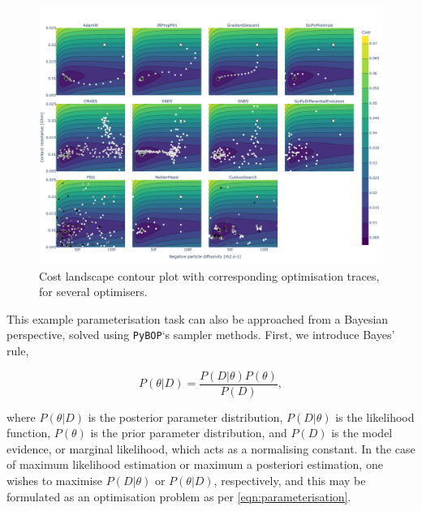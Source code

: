 \documentclass[
]{article}
\begin{document}
\begin{figure}[htb]
\centering
\includegraphics[width=1\textwidth,height=\textheight]{figures/joss/contour_subplot.pdf}
\caption{Cost landscape contour plot with corresponding optimisation
traces, for several optimisers. \label{fig:optimiser-inference2}}
\end{figure}

This example parameterisation task can also be approached from a
Bayesian perspective, solved using \texttt{PyBOP}`s sampler methods.
First, we introduce Bayes' rule,

\begin{equation}
P(\theta|D) = \frac{P(D|\theta)P(\theta)}{P(D)},
\label{eqn:bayes_theorem}
\end{equation}

where \(P(\theta|D)\) is the posterior parameter distribution,
\(P(D|\theta)\) is the likelihood function, \(P(\theta)\) is the prior
parameter distribution, and \(P(D)\) is the model evidence, or marginal
likelihood, which acts as a normalising constant. In the case of maximum
likelihood estimation or maximum a posteriori estimation, one wishes to
maximise \(P(D|\theta)\) or \(P(\theta|D)\), respectively, and this may
be formulated as an optimisation problem as per
\autoref{eqn:parameterisation}.
\end{document}
